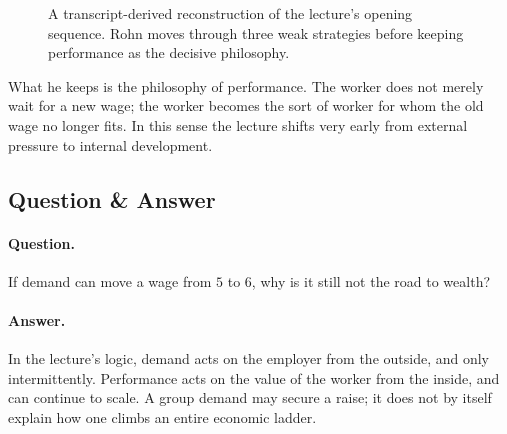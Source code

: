 \begin{figure}[t]
\centering
{}
\caption{A transcript-derived reconstruction of the lecture's opening sequence. Rohn moves through three weak strategies before keeping performance as the decisive philosophy.}
\end{figure}

What he keeps is the philosophy of performance. The worker does not merely wait for a new wage; the worker becomes the sort of worker for whom the old wage no longer fits. In this sense the lecture shifts very early from external pressure to internal development.

\subsection{Question \& Answer}

\paragraph{Question.} If demand can move a wage from \(5\) to \(6\), why is it still not the road to wealth?

\paragraph{Answer.} In the lecture's logic, demand acts on the employer from the outside, and only intermittently. Performance acts on the value of the worker from the inside, and can continue to scale. A group demand may secure a raise; it does not by itself explain how one climbs an entire economic ladder.

